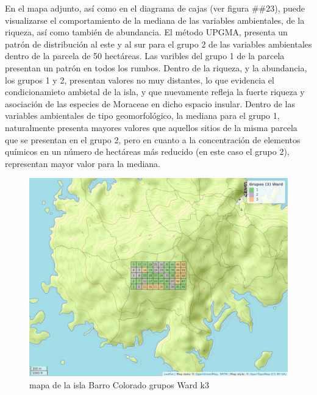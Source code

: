 \documentclass[11pt,]{article}
\begin{document}
En el mapa adjunto, así como en el diagrama de cajas (ver figura
\#\#23), puede visualizarse el comportamiento de la mediana de las
variables ambientales, de la riqueza, así como también de abundancia. El
método UPGMA, presenta un patrón de distribución al este y al sur para
el grupo 2 de las variables ambientales dentro de la parcela de 50
hectáreas. Las varibles del grupo 1 de la parcela presentan un patrón en
todos los rumbos. Dentro de la riqueza, y la abundancia, los grupos 1 y
2, presentan valores no muy distantes, lo que evidencia el
condicionamieto ambietal de la isla, y que nuevamente refleja la fuerte
riqueza y asociación de las especies de Moraceae en dicho espacio
insular. Dentro de las variables ambientales de tipo geomorfológico, la
mediana para el grupo 1, naturalmente presenta mayores valores que
aquellos sitios de la misma parcela que se presentan en el grupo 2, pero
en cuanto a la concentración de elementos químicos en un número de
hectáreas más reducido (en este caso el grupo 2), representan mayor
valor para la mediana.

\begin{figure}
\centering
\includegraphics[width=1.00000\textwidth]{mapa_ward_k3.png}
\caption{mapa de la isla Barro Colorado grupos Ward k3
\label{fig:bci_map}}
\end{figure}
\end{document}
